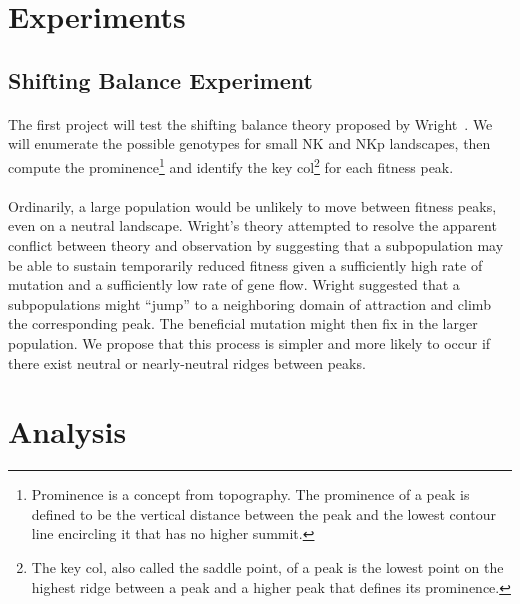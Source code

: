 \documentclass[12pt,letterpaper,titlepage]{article}
\begin{document}
\section{Experiments}

\subsection{Shifting Balance Experiment}

\paragraph{}
The first project will test the shifting balance theory proposed by
Wright~\cite{Wright1982}\cite{Wright1931}. We will enumerate the possible
genotypes for small NK and NKp landscapes, then compute the
prominence\footnote{Prominence is a concept from topography. The prominence of
a peak is defined to be the vertical distance between the peak and the
lowest contour line encircling it that has no higher summit.} and identify the
key col\footnote{The key col, also called the saddle point, of a peak is the
lowest point on the highest ridge between a peak and a higher peak that
defines its prominence.} for each fitness peak.

\paragraph{}
Ordinarily, a large population would be unlikely to move between fitness peaks,
even on a neutral landscape. Wright's theory attempted to resolve the apparent
conflict between theory and observation by suggesting that a subpopulation may
be able to sustain temporarily reduced fitness given a sufficiently high rate
of mutation and a sufficiently low rate of gene flow. Wright suggested that a
subpopulations might ``jump'' to a neighboring domain of attraction and climb
the corresponding peak. The beneficial mutation might then fix in the larger
population. We propose that this process is simpler and more likely to occur if
there exist neutral or nearly-neutral ridges between peaks.

\section{Analysis}


{}
\end{document}
